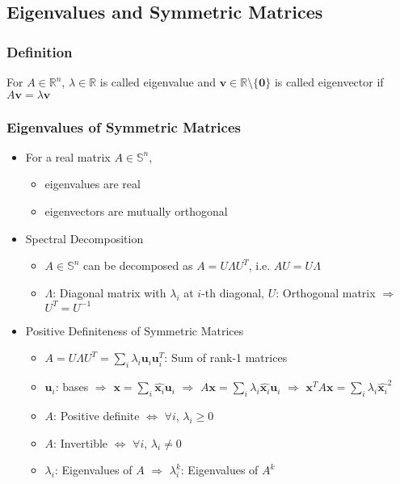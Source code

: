 \subsection{Eigenvalues and Symmetric Matrices}

\subsubsection*{Definition}
For $A \in \mathbb{R}^n$, $\lambda \in \mathbb{R}$ is called eigenvalue and
$\mathbf{v} \in \mathbb{R}\setminus\{\mathbf{0}\}$ is called eigenvector if $ A\mathbf{v} = \lambda\mathbf{v} $

\subsubsection*{Eigenvalues of Symmetric Matrices}
\begin{itemize}
    \item For a real matrix $A \in \mathbb{S}^n$,
    \begin{itemize}
        \item eigenvalues are real
        \item eigenvectors are mutually orthogonal
    \end{itemize}
    \item Spectral Decomposition
    \begin{itemize}
        \item $A \in \mathbb{S}^n$ can be decomposed as $A = U\Lambda U^T$, i.e. $AU = U\Lambda$
        \item $\Lambda$: Diagonal matrix with $\lambda_i$ at $i$-th diagonal,
            $U$: Orthogonal matrix $\Rightarrow$ $U^T = U^{-1}$
    \end{itemize}
    \item Positive Definiteness of Symmetric Matrices
    \begin{itemize}
        \item $A = U\Lambda U^T = \sum_i \lambda_i \mathbf{u}_i \mathbf{u}_i^T$: Sum of rank-1 matrices
        \item $\mathbf{u}_i$: bases $\Rightarrow$ $\mathbf{x} = \sum_{i} \hat{\mathbf{x}_i}\mathbf{u}_i$
            $\Rightarrow$ $A\mathbf{x} = \sum_{i} \lambda_i \hat{\mathbf{x}_i}\mathbf{u}_i$
            $\Rightarrow$ $\mathbf{x}^TA\mathbf{x} = \sum_{i} \lambda_i \hat{\mathbf{x}_i}^2$
        \item $A$: Positive definite $\Leftrightarrow$ $\forall i$, $\lambda_i \geq 0$
        \item $A$: Invertible $\Leftrightarrow$ $\forall i$, $\lambda_i \neq 0$
        \item $\lambda_i$: Eigenvalues of $A$ $\Rightarrow$ $\lambda_i^k$: Eigenvalues of $A^k$
    \end{itemize}
\end{itemize}

